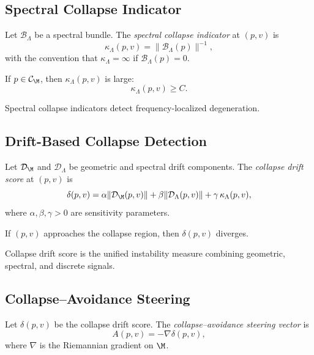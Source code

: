 \subsection{Spectral Collapse Indicator}

\begin{definition}
Let $\mathcal{B}_\Lambda$ be a spectral bundle.  
The \emph{spectral collapse indicator} at $(p,v)$ is
\[
\kappa_\Lambda(p,v)
= \| \mathcal{B}_\Lambda(p) \|^{-1},
\]
with the convention that $\kappa_\Lambda = \infty$ if
$\mathcal{B}_\Lambda(p) = 0$.
\end{definition}

\begin{lemma}
If $p \in \mathcal{C}_\M$, then $\kappa_\Lambda(p,v)$ is large:
\[
\kappa_\Lambda(p,v) \ge C.
\]
\end{lemma}

\begin{remark}
Spectral collapse indicators detect frequency-localized degeneration.
\end{remark}

\subsection{Drift-Based Collapse Detection}

\begin{definition}
Let $\mathcal{D}_\M$ and $\mathcal{D}_\Lambda$ be geometric and spectral
drift components.  
The \emph{collapse drift score} at $(p,v)$ is
\[
\delta(p,v)
= \alpha \|\mathcal{D}_\M(p,v)\|
+ \beta \|\mathcal{D}_\Lambda(p,v)\|
+ \gamma\, \kappa_\Lambda(p,v),
\]
where $\alpha,\beta,\gamma > 0$ are sensitivity parameters.
\end{definition}

\begin{lemma}
If $(p,v)$ approaches the collapse region, then $\delta(p,v)$ diverges.
\end{lemma}

\begin{remark}
Collapse drift score is the unified instability measure combining
geometric, spectral, and discrete signals.
\end{remark}

\subsection{Collapse--Avoidance Steering}

\begin{definition}
Let $\delta(p,v)$ be the collapse drift score.  
The \emph{collapse--avoidance steering vector} is
\[
A(p,v)
= -\nabla \delta(p,v),
\]
where $\nabla$ is the Riemannian gradient on $\M$.
\end{definition}

